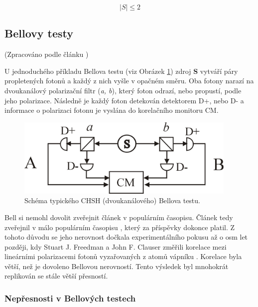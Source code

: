 \begin{equation}
    |S| \leq 2
    \label{eq:6}
\end{equation}

\subsection{Bellovy testy}
(Zpracováno podle článku \cite{belltest})

U jednoduchého příkladu Bellova testu (viz Obrázek \ref{fig:6}) zdroj \textbf{S} vytváří páry propletených fotonů a každý z nich vyšle v opačném směru. Oba fotony narazí na dvoukanálový polarizační filtr (\emph{a, b}), který foton odrazí, nebo propustí, podle jeho polarizace. Následně je každý foton detekován detektorem D+, nebo D- a informace o polarizaci fotonu je vyslána do korelačního monitoru CM.

\begin{figure}[ht]
    \centering
    \includegraphics[width=300pt]{images/Two_channel.png}
    \caption{\label{fig:6}Schéma typického CHSH (dvoukanálového) Bellova testu.}
\end{figure}

Bell si nemohl dovolit zveřejnit článek v populárním časopisu. Článek tedy zveřejnil v málo populárním časopisu , který za příspěvky dokonce platil. Z tohoto důvodu se jeho nerovnost dočkala experimentálního pokusu až o osm let později, kdy Stuart J. Freedman a John F. Clauser změřili korelace mezi lineárními polarizacemi fotonů vyzařovaných z atomů vápníku \parencite*{belltest:1}. Korelace byla větší, než je dovoleno Bellovou nerovností. Tento výsledek byl mnohokrát replikován se stále větší přesností. 

\subsubsection{Nepřesnosti v Bellových testech}

